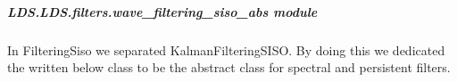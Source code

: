 \documentclass[letterpaper,10pt,english]{sphinxmanual}
\begin{document}
\subparagraph{LDS.LDS.filters.wave\_filtering\_siso\_abs module}
\label{\detokenize{LDS.LDS.filters:module-LDS.LDS.filters.wave_filtering_siso_abs}}\label{\detokenize{LDS.LDS.filters:lds-lds-filters-wave-filtering-siso-abs-module}}
\sphinxAtStartPar
In FilteringSiso we separated KalmanFilteringSISO. By doing this we dedicated
the written below class to be the abstract class for spectral and persistent filters.
\end{document}
